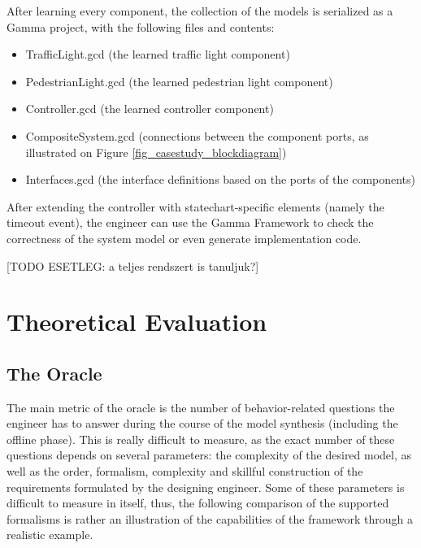 After learning every component, the collection of the models is serialized as a Gamma project, with the following files and contents:
\begin{itemize}
	\item TrafficLight.gcd (the learned traffic light component)
	\item PedestrianLight.gcd (the learned pedestrian light component)
	\item Controller.gcd (the learned controller component)
	\item CompositeSystem.gcd (connections between the component ports, as illustrated on Figure \ref{fig_casestudy_blockdiagram})
	\item Interfaces.gcd (the interface definitions based on the ports of the components)
\end{itemize}
After extending the controller with statechart-specific elements (namely the timeout event), the engineer can use the Gamma Framework to check the correctness of the system model or even generate implementation code.


[TODO ESETLEG: a teljes rendszert is tanuljuk?]

\clearpage
\section{Theoretical Evaluation} \label{sec_theoeval}

\subsection{The Oracle} \label{subs_evaloracle}
The main metric of the oracle is the number of behavior-related questions the engineer has to answer during the course of the model synthesis (including the offline phase). This is really difficult to measure, as the exact number of these questions depends on several parameters: the complexity of the desired model, as well as the order, formalism, complexity and skillful construction of the requirements formulated by the designing engineer. Some of these parameters is difficult to measure in itself, thus, the following comparison of the supported formalisms is rather an illustration of the capabilities of the framework through a realistic example. 

